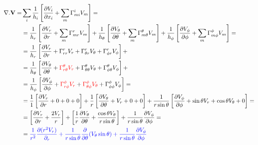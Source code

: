 \documentclass[11pt]{article}
\begin{document}
\begin{align}
\nabla . {\bf{V}} = & \sum_i \frac{1}{h_i} \left[ \frac{\partial V_i}{\partial x_i} + \sum_m \Gamma_{mi}^i V_m \right] = \\
 & = \frac{1}{h_r} \left[\frac{\partial V_r}{\partial r} + \sum_m \Gamma_{mr}^r V_m \right] + \frac{1}{h_\theta} \left[\frac{\partial V_\theta}{\partial \theta} + \sum_m \Gamma_{m\theta}^\theta V_m \right] +\frac{1}{h_\phi} \left[\frac{\partial V_\phi}{\partial \phi} + \sum_m \Gamma_{m\phi}^\phi V_m \right] = \\
& = \frac{1}{h_r} \left[\frac{\partial V_r}{\partial r} + \Gamma_{rr}^r V_r + \Gamma_{\theta r}^r V_\theta + \Gamma_{\phi r}^r V_\phi \right] + \\
& = \frac{1}{h_\theta} \left[\frac{\partial V_\theta}{\partial \theta} + {\color{red} \Gamma_{r\theta}^\theta V_r} + \Gamma_{\theta \theta}^\theta V_\theta + \Gamma_{\phi \theta}^\theta V_\phi \right] + \\
& = \frac{1}{h_\phi}  \left[\frac{\partial V_\phi}{\partial \phi} + {\color{red} \Gamma_{r\phi}^\phi V_r} + {\color{red} \Gamma_{\theta \phi}^\phi V_\theta} + \Gamma_{\phi \phi}^\phi V_\phi \right] = \\
& = \frac{1}{1} \left[\frac{\partial V_r}{\partial r} + 0 + 0 + 0 \right] + \frac{1}{r} \left[\frac{\partial V_\theta}{\partial \theta} + V_r + 0 + 0 \right] + \frac{1}{r \sin{\theta}}  \left[\frac{\partial V_\phi}{\partial \phi} + \sin{\theta} V_r + \cos{\theta} V_\theta + 0 \right] = \\
& = \left[\frac{\partial V_r}{\partial r} + \frac{2 V_r}{r} \right] + \left[\frac{1}{r}\frac{\partial V_\theta}{\partial \theta} + \frac{\cos{\theta} V_\theta}{r \sin{\theta}} \right] + \frac{1}{r \sin{\theta}} \frac{\partial V_\phi}{\partial \phi} = \\
& = {\color{blue} \frac{1}{r^2} \frac{\partial (r^2 V_r) }{\partial_r} + \frac{1}{r \sin{\theta}}\frac{\partial}{\partial \theta}(V_\theta \sin{\theta}) + \frac{1}{r \sin{\theta}} \frac{\partial V_\phi}{\partial \phi} }
\end{align}
\end{document}
